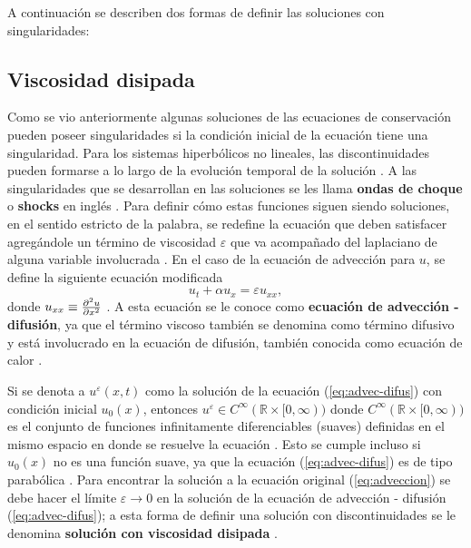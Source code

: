 A continuación se describen dos formas de definir las soluciones con singularidades:
\subsection{Viscosidad disipada}
Como se vio anteriormente algunas soluciones de las ecuaciones de conservación pueden poseer singularidades si la condición inicial de la ecuación tiene una singularidad. Para los sistemas hiperbólicos no lineales, las discontinuidades pueden formarse a lo largo de la evolución temporal de la solución \cite{Leveque}. A las singularidades que se desarrollan en las soluciones se les llama \textbf{ondas de choque} o \textbf{shocks} en inglés \cite{Cameron}. Para definir cómo estas funciones siguen siendo soluciones, en el sentido estricto de la palabra, se redefine la ecuación que deben satisfacer agregándole un término de viscosidad $\varepsilon$ que va acompañado del laplaciano de alguna variable involucrada \cite{Leveque}. En el caso de la ecuación de advección para $u$, se define la siguiente ecuación modificada
\begin{equation}
	u_t + \alpha u_x = \varepsilon u_{xx},
	\label{eq:advec-difus}
\end{equation}
donde $u_{xx} \equiv \pdv[2]{u}{x}$ \cite{Leveque}. A esta ecuación se le conoce como \textbf{ecuación de advección - difusión}, ya que el término viscoso también se denomina como término difusivo y está involucrado en la ecuación de difusión, también conocida como ecuación de calor \cite{heattransfer}. 

Si se denota a $u^{\varepsilon}(x,t)$ como la solución de la ecuación (\ref{eq:advec-difus}) con condición inicial $u_0(x)$, entonces $u^{\varepsilon} \in C^{\infty}(\mathbb{R} \times [0,\infty)) $ donde $ C^{\infty}(\mathbb{R}\times [0,\infty))$ es el conjunto de funciones infinitamente diferenciables (suaves) definidas en el mismo espacio en donde se resuelve la ecuación \cite{Leveque}. Esto se cumple incluso si $u_0(x)$ no es una función suave, ya que la ecuación (\ref{eq:advec-difus}) es de tipo parabólica \cite{Leveque}. Para encontrar la solución a la ecuación original (\ref{eq:adveccion}) se debe hacer el límite $\varepsilon \rightarrow 0$ en la solución de la ecuación de advección - difusión (\ref{eq:advec-difus}); a esta forma de definir una solución con discontinuidades se le denomina \textbf{solución con viscosidad disipada} \cite{Leveque}.
